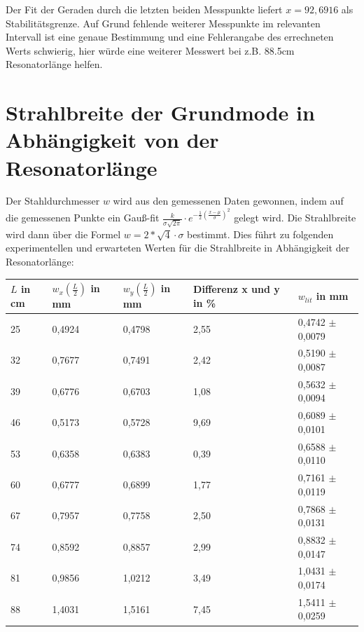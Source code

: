 \documentclass[bigchapter,colorback,accentcolor=tud4b,linedtoc,11pt]{tudreport}
\numberwithin{equation}{subsection}
\begin{document}
Der Fit der Geraden durch die letzten beiden Messpunkte liefert $x=92,6916$ als Stabilitätsgrenze. Auf Grund fehlende weiterer Messpunkte im relevanten Intervall ist eine genaue Bestimmung und eine Fehlerangabe des errechneten Werts schwierig, hier würde eine weiterer Messwert bei z.B. 88.5cm Resonatorlänge helfen.
\section{Strahlbreite der Grundmode in Abhängigkeit von der Resonatorlänge}
Der Stahldurchmesser $w$ wird aus den gemessenen Daten gewonnen, indem auf die gemessenen Punkte ein Gauß-fit 
$\frac{k}{\sigma\sqrt{2\pi}} \cdot {e}^{-\frac{1}{2}\left(\frac{x-\mu}{\sigma}\right)^{2}}$
gelegt wird. Die Strahlbreite wird dann über die Formel
$w=2*\sqrt{4}\cdot\sigma$
bestimmt. Dies führt zu folgenden experimentellen und erwarteten Werten für die Strahlbreite in Abhängigkeit der Resonatorlänge:
\begin{center}
    \begin{tabular}{ | l | l | l | l | p{4cm} |}
    \hline
    $L$ in cm & $w_x\left(\frac{L}{2}\right)$ in mm & $w_y\left(\frac{L}{2}\right)$ in mm & Differenz x und y in \% & $w_{lit}$ in mm \\ \hline
    25 & 0,4924 & 0,4798 & 2,55 & 0,4742 $\pm$0,0079 \\ \hline
    32 & 0,7677 & 0,7491 & 2,42 & 0,5190 $\pm$0,0087 \\ \hline
    39 & 0,6776 & 0,6703 & 1,08 & 0,5632 $\pm$0,0094 \\ \hline
    46 & 0,5173 & 0,5728 & 9,69 & 0,6089 $\pm$0,0101 \\ \hline
    53 & 0,6358 & 0,6383 & 0,39 & 0,6588 $\pm$0,0110 \\ \hline
    60 & 0,6777 & 0,6899 & 1,77 & 0,7161 $\pm$0,0119 \\ \hline
    67 & 0,7957 & 0,7758 & 2,50 & 0,7868 $\pm$0,0131 \\ \hline
    74 & 0,8592 & 0,8857 & 2,99 & 0,8832 $\pm$0,0147 \\ \hline
    81 & 0,9856 & 1,0212 & 3,49 & 1,0431 $\pm$0,0174 \\ \hline
    88 & 1,4031 & 1,5161 & 7,45 & 1,5411 $\pm$0,0259 \\ \hline
    
    \end{tabular}
\end{center}
\end{document}
